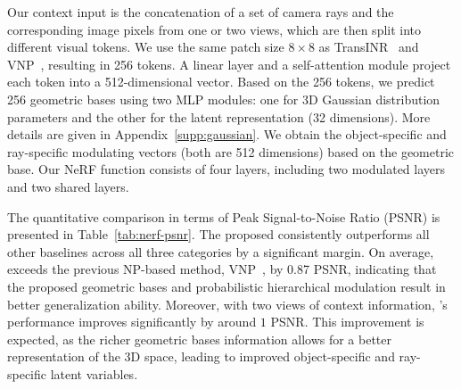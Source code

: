  Our context input is the concatenation of a set of camera rays and the corresponding image pixels from one or two views, which are then split into different visual tokens. We use the same patch size \(8 \times 8\) as TransINR~\citep{chen2022transformers} and VNP~\citep{guo2023versatile}, resulting in 256 tokens. A linear layer and a self-attention module project each token into a 512-dimensional vector. Based on the 256 tokens, we predict 256 geometric bases using two MLP modules: one for 3D Gaussian distribution parameters and the other for the latent representation (32 dimensions).
More details are given in Appendix~\ref{supp:gaussian}. 
We obtain the object-specific and ray-specific modulating vectors (both are 512 dimensions) based on the geometric base. Our NeRF function consists of four layers, including two modulated layers and two shared layers. %

 The quantitative comparison in terms of Peak Signal-to-Noise Ratio (PSNR) is presented in Table~\ref{tab:nerf-psnr}. The proposed \method{} consistently outperforms all other baselines across all three categories by a significant margin. On average, \method{} exceeds the previous NP-based method, VNP~\citep{guo2023versatile}, by 0.87 PSNR, %
indicating that the proposed geometric bases and probabilistic hierarchical modulation result in better generalization ability. Moreover, with two views of context information, \method{}'s performance improves significantly by around $1$ PSNR. This improvement is expected, as the richer geometric bases information allows for a better representation of the 3D space, leading to improved object-specific and ray-specific latent variables. %




